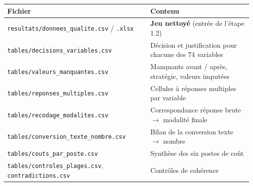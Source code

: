 \documentclass[

  french,

  10pt,

  a4paper,

]{article}
\newcounter{none} %
\begin{document}
{\def\LTcaptype{none} %

\begin{longtable}[]{@{}

  >{\raggedright\arraybackslash}p{}

  >{\raggedright\arraybackslash}p{}@{}}

\toprule\noalign{}

\begin{minipage}[b]{\linewidth}\raggedright

Fichier

\end{minipage} & \begin{minipage}[b]{\linewidth}\raggedright

Contenu

\end{minipage} \\

\midrule\noalign{}

\endhead

\bottomrule\noalign{}

\endlastfoot

\texttt{resultats/donnees\_qualite.csv} / \texttt{.xlsx} & \textbf{Jeu nettoyé} (entrée de l'étape 1.2) \\

\texttt{tables/decisions\_variables.csv} & Décision et justification pour chacune des 74 variables \\

\texttt{tables/valeurs\_manquantes.csv} & Manquants avant / après, stratégie, valeurs imputées \\

\texttt{tables/reponses\_multiples.csv} & Cellules à réponses multiples par variable \\

\texttt{tables/recodage\_modalites.csv} & Correspondance réponse brute \ensuremath{\rightarrow} modalité finale \\

\texttt{tables/conversion\_texte\_nombre.csv} & Bilan de la conversion texte \ensuremath{\rightarrow} nombre \\

\texttt{tables/couts\_par\_poste.csv} & Synthèse des six postes de coût \\

\texttt{tables/controles\_plages.csv}, \texttt{contradictions.csv} & Contrôles de cohérence \\


\end{longtable}}
\end{document}
